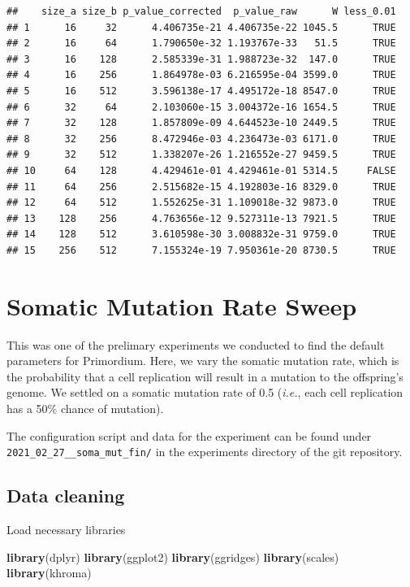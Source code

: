 \documentclass[]{book}
\newenvironment{Shaded}{\begin{snugshade}}{\end{snugshade}}
\newcommand{\KeywordTok}[1]{\textcolor[rgb]{0.13,0.29,0.53}{\textbf{#1}}}
\newcommand{\NormalTok}[1]{#1}
\begin{document}
\begin{verbatim}
##    size_a size_b p_value_corrected  p_value_raw      W less_0.01
## 1      16     32      4.406735e-21 4.406735e-22 1045.5      TRUE
## 2      16     64      1.790650e-32 1.193767e-33   51.5      TRUE
## 3      16    128      2.585339e-31 1.988723e-32  147.0      TRUE
## 4      16    256      1.864978e-03 6.216595e-04 3599.0      TRUE
## 5      16    512      3.596138e-17 4.495172e-18 8547.0      TRUE
## 6      32     64      2.103060e-15 3.004372e-16 1654.5      TRUE
## 7      32    128      1.857809e-09 4.644523e-10 2449.5      TRUE
## 8      32    256      8.472946e-03 4.236473e-03 6171.0      TRUE
## 9      32    512      1.338207e-26 1.216552e-27 9459.5      TRUE
## 10     64    128      4.429461e-01 4.429461e-01 5314.5     FALSE
## 11     64    256      2.515682e-15 4.192803e-16 8329.0      TRUE
## 12     64    512      1.552625e-31 1.109018e-32 9873.0      TRUE
## 13    128    256      4.763656e-12 9.527311e-13 7921.5      TRUE
## 14    128    512      3.610598e-30 3.008832e-31 9759.0      TRUE
## 15    256    512      7.155324e-19 7.950361e-20 8730.5      TRUE
\end{verbatim}

\hypertarget{somatic-mutation-rate-sweep}{%
\chapter{Somatic Mutation Rate Sweep}\label{somatic-mutation-rate-sweep}}

This was one of the prelimary experiments we conducted to find the default parameters for Primordium.
Here, we vary the somatic mutation rate, which is the probability that a cell replication will result in a mutation to the offspring's genome.
We settled on a somatic mutation rate of 0.5 (\emph{i.e.}, each cell replication has a 50\% chance of mutation).

The configuration script and data for the experiment can be found under \texttt{2021\_02\_27\_\_soma\_mut\_fin/} in the experiments directory of the git repository.

\hypertarget{data-cleaning-1}{%
\section{Data cleaning}\label{data-cleaning-1}}

Load necessary libraries

\begin{Shaded}
\begin{Highlighting}[]
\KeywordTok{library}\NormalTok{(dplyr)}
\KeywordTok{library}\NormalTok{(ggplot2)}
\KeywordTok{library}\NormalTok{(ggridges)}
\KeywordTok{library}\NormalTok{(scales)}
\KeywordTok{library}\NormalTok{(khroma)}
\end{Highlighting}
\end{Shaded}
\end{document}
